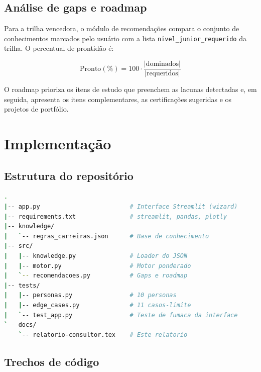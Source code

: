 \documentclass[12pt,a4paper]{article}
\begin{document}
\subsection{An\'alise de gaps e roadmap}

Para a trilha vencedora, o m\'odulo de recomenda\c{c}\~oes compara o conjunto de
conhecimentos marcados pelo usu\'ario com a lista \texttt{nivel\_junior\_requerido}
da trilha. O percentual de prontid\~ao \'e:

\begin{equation}
\text{Pronto}(\%) = 100 \cdot \frac{|\text{dominados}|}{|\text{requeridos}|}
\end{equation}

O roadmap prioriza os itens de estudo que preenchem as lacunas detectadas e, em
seguida, apresenta os itens complementares, as certifica\c{c}\~oes sugeridas e os
projetos de portf\'olio.

\clearpage
\section{Implementa\c{c}\~ao}

\subsection{Estrutura do reposit\'orio}

\noindent\begin{minipage}{\linewidth}
\begin{lstlisting}[language=bash, caption={Estrutura de arquivos.}]
.
|-- app.py                         # Interface Streamlit (wizard)
|-- requirements.txt               # streamlit, pandas, plotly
|-- knowledge/
|   `-- regras_carreiras.json      # Base de conhecimento
|-- src/
|   |-- knowledge.py               # Loader do JSON
|   |-- motor.py                   # Motor ponderado
|   `-- recomendacoes.py           # Gaps e roadmap
|-- tests/
|   |-- personas.py                # 10 personas
|   |-- edge_cases.py              # 11 casos-limite
|   `-- test_app.py                # Teste de fumaca da interface
`-- docs/
    `-- relatorio-consultor.tex    # Este relatorio
\end{lstlisting}
\end{minipage}

\subsection{Trechos de c\'odigo}
\end{document}
